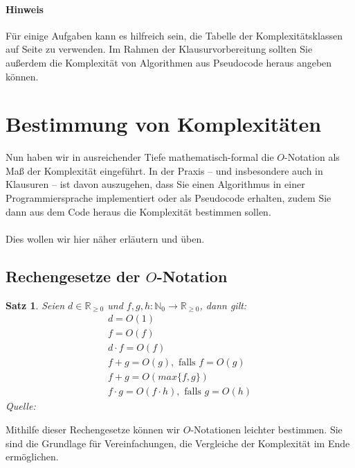 \documentclass[11pt,a4paper]{scrartcl}
\newtheorem{satz}{Satz}
\begin{document}
\paragraph{Hinweis} Für einige Aufgaben kann es hilfreich sein, die Tabelle der Komplexitätsklassen auf Seite \pageref{kmplxtab} zu verwenden. Im Rahmen der Klausurvorbereitung sollten Sie außerdem die Komplexität von Algorithmen aus Pseudocode heraus angeben können.
\pagebreak
\section{Bestimmung von Komplexitäten}
Nun haben wir in ausreichender Tiefe mathematisch-formal die $O$-Notation als Maß der Komplexität eingeführt. In der Praxis -- und insbesondere auch in Klausuren -- ist davon auszugehen, dass Sie einen Algorithmus in einer Programmiersprache implementiert oder als Pseudocode erhalten, zudem Sie dann aus dem Code heraus die Komplexität bestimmen sollen. \\\\
Dies wollen wir hier näher erläutern und üben.
\subsection{Rechengesetze der $O$-Notation}
\begin{satz}
Seien $d \in \mathbb{R}_{\geq 0}$ und $f, g, h: \mathbb{N}_0 \to \mathbb{R}_{\geq 0}$, dann gilt:
\begin{align}
 d = O(1) \\
 f = O(f) \\
 d \cdot f = O(f) \\
 f + g = O(g), \text{ falls } f = O(g) \\
 f + g = O(max\{f, g\}) \\
 f \cdot g = O(f \cdot h), \text{ falls } g = O(h)
\end{align}
Quelle: \parencite[][S. 67]{AlgInfTheo}
\end{satz}
Mithilfe dieser Rechengesetze können wir $O$-Notationen leichter bestimmen. Sie sind die Grundlage für Vereinfachungen, die Vergleiche der Komplexität im Ende ermöglichen.
\end{document}
